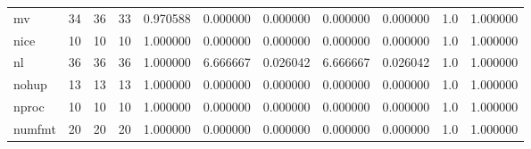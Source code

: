 \begin{tabular}{lrrrrrrrrrr}
mv        &                                      34 &                 36 &                                33 &                                   0.970588 &                               0.000000 &                                     0.000000 &                          0.000000 &                                0.000000 &                                1.0 &                                           1.000000 \\
nice      &                                      10 &                 10 &                                10 &                                   1.000000 &                               0.000000 &                                     0.000000 &                          0.000000 &                                0.000000 &                                1.0 &                                           1.000000 \\
nl        &                                      36 &                 36 &                                36 &                                   1.000000 &                               6.666667 &                                     0.026042 &                          6.666667 &                                0.026042 &                                1.0 &                                           1.000000 \\
nohup     &                                      13 &                 13 &                                13 &                                   1.000000 &                               0.000000 &                                     0.000000 &                          0.000000 &                                0.000000 &                                1.0 &                                           1.000000 \\
nproc     &                                      10 &                 10 &                                10 &                                   1.000000 &                               0.000000 &                                     0.000000 &                          0.000000 &                                0.000000 &                                1.0 &                                           1.000000 \\
numfmt    &                                      20 &                 20 &                                20 &                                   1.000000 &                               0.000000 &                                     0.000000 &                          0.000000 &                                0.000000 &                                1.0 &                                           1.000000 \\

\end{tabular}
